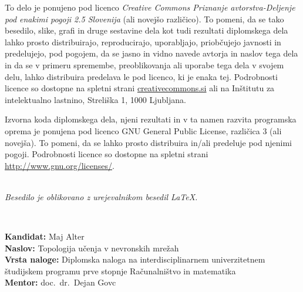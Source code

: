 \newpage
\thispagestyle{empty}

\vspace*{5cm}
{\small \noindent
  To delo je ponujeno pod licenco \textit{Creative Commons Priznanje avtorstva-Deljenje pod enakimi pogoji 2.5 Slovenija} (ali novej\v so razli\v cico).
  To pomeni, da se tako besedilo, slike, grafi in druge sestavine dela kot tudi rezultati diplomskega dela lahko prosto distribuirajo,
  reproducirajo, uporabljajo, priobčujejo javnosti in predelujejo, pod pogojem, da se jasno in vidno navede avtorja in naslov tega
  dela in da se v primeru spremembe, preoblikovanja ali uporabe tega dela v svojem delu, lahko distribuira predelava le pod
  licenco, ki je enaka tej.
  Podrobnosti licence so dostopne na spletni strani \href{http://creativecommons.si}{creativecommons.si} ali na Inštitutu za
  intelektualno lastnino, Streliška 1, 1000 Ljubljana.

  \vspace*{1cm}
  \begin{center}%
    \hspace*{1ex}\hspace*{1ex}%
  \end{center}
}

\vspace*{1cm}
{\small \noindent
  Izvorna koda diplomskega dela, njeni rezultati in v ta namen razvita programska oprema je ponujena pod licenco GNU General Public License,
  različica 3 (ali novejša). To pomeni, da se lahko prosto distribuira in/ali predeluje pod njenimi pogoji.
  Podrobnosti licence so dostopne na spletni strani \url{http://www.gnu.org/licenses/}.
}

\vfill
\begin{center}
  \ \\ \vfill
  {\em
    Besedilo je oblikovano z urejevalnikom besedil \LaTeX.}
\end{center}

\clearemptydoublepage{}

\thispagestyle{empty}
\
\vfill

\bigskip
\noindent\textbf{Kandidat:} Maj Alter\\
\noindent\textbf{Naslov:} Topologija učenja v nevronskih mrežah\\
\noindent\textbf{Vrsta naloge:} Diplomska naloga na interdisciplinarnem univerzitetnem študijskem programu prve stopnje Računalništvo in matematika \\
\noindent\textbf{Mentor:} doc.\ dr.\ Dejan Govc\\

